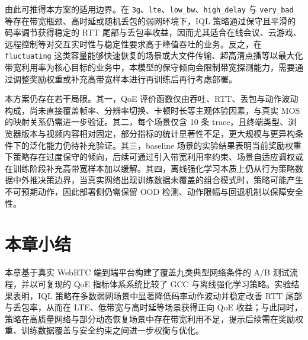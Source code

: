 由此可推得本方案的适用边界。在 \texttt{3g}、\texttt{lte}、\texttt{low\_bw}、\texttt{high\_delay} 与 \texttt{very\_bad} 等存在带宽瓶颈、高时延或随机丢包的弱网环境下，IQL 策略通过保守且平滑的码率调节获得稳定的 RTT 尾部与丢包率收益，因而尤其适合在线会议、云游戏、远程控制等对交互实时性与稳定性要求高于峰值吞吐的业务。反之，在 \texttt{fluctuating} 这类容量能够快速恢复的场景或大文件传输、超高清点播等以最大化带宽利用率为核心目标的业务中，本模型的保守倾向会限制带宽探测能力，需要通过调整奖励权重或补充高带宽样本进行再训练后再行考虑部署。

本方案仍存在若干局限。其一，QoE 评价函数仅由吞吐、RTT、丢包与动作波动构成，尚未直接覆盖帧率、分辨率切换、卡顿时长等主观体验因素，与真实 MOS 的映射关系仍需进一步验证。其二，每个场景仅含 10 条 trace，且终端类型、浏览器版本与视频内容相对固定，部分指标的统计显著性不足，更大规模与更异构条件下的泛化能力仍待补充验证。其三，baseline 场景的实验结果表明当前奖励权重下策略存在过度保守的倾向，后续可通过引入带宽利用率约束、场景自适应调权或在训练阶段补充高带宽样本加以缓解。其四，离线强化学习本质上仍从行为策略数据中外推决策边界，当真实网络出现训练数据未覆盖的组合模式时，策略可能产生不可预期动作，因此部署侧仍需保留 OOD 检测、动作限幅与回退机制以保障安全性。

\section{本章小结}

本章基于真实 WebRTC 端到端平台构建了覆盖九类典型网络条件的 A/B 测试流程，并以可复现的 QoE 指标体系系统比较了 GCC 与离线强化学习策略。实验结果表明，IQL 策略在多数弱网场景中显著降低码率动作波动并稳定改善 RTT 尾部与丢包率，从而在 LTE、低带宽与高时延等场景获得正向 QoE 收益；与此同时，策略在高质量网络与部分动态恢复场景中存在带宽利用不足，提示后续需在奖励权重、训练数据覆盖与安全约束之间进一步权衡与优化。
